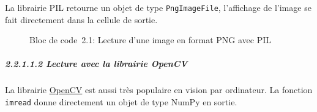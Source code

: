 La librairie PIL retourne un objet de type \texttt{PngImageFile},
l'affichage de l'image se fait directement dans la cellule de sortie.

\label{2b6fa7e0}
\label{lst-lecture-PIL-PNG}
\begin{figure}
\centering
{}\label{lst-lecture-PIL-PNG}
\begin{Shaded}
\begin{Highlighting}[]
\OperatorTok{=}\NormalTok{(}\NormalTok{)}
\end{Highlighting}
\end{Shaded}
\caption{Bloc de code~2.1: Lecture d'une image en format PNG avec PIL}
\end{figure}

\begin{figure}
\centering
{}
\caption{}
\end{figure}

\subparagraph{\texorpdfstring{{2.2.1.1.2} Lecture avec la librairie
OpenCV}{2.2.1.1.2 Lecture avec la librairie OpenCV}}\label{lecture-avec-la-librairie-opencv}

La librairie \href{https://docs.opencv.org/4.10.0/index.html}{OpenCV}
est aussi très populaire en vision par ordinateur. La fonction
\texttt{imread} donne directement un objet de type NumPy en sortie.

